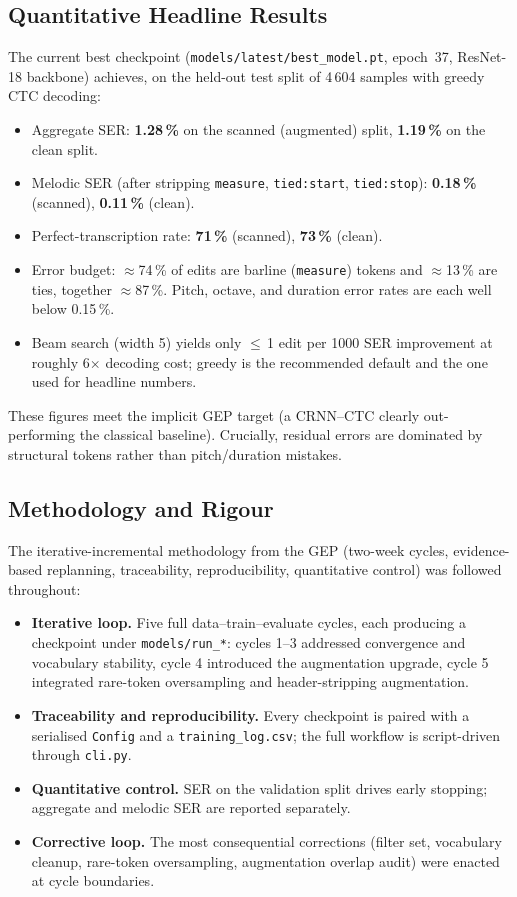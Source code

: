 \documentclass[11pt, a4paper]{article}
\begin{document}
\subsection{Quantitative Headline Results}
The current best checkpoint (\texttt{models/latest/best\_model.pt}, epoch~37, ResNet-18 backbone) achieves, on the held-out test split of 4\,604 samples with greedy CTC decoding:

\begin{itemize}
    \item Aggregate SER: \textbf{1.28\,\%} on the scanned (augmented) split, \textbf{1.19\,\%} on the clean split.
    \item Melodic SER (after stripping \texttt{measure}, \texttt{tied:start}, \texttt{tied:stop}): \textbf{0.18\,\%} (scanned), \textbf{0.11\,\%} (clean).
    \item Perfect-transcription rate: \textbf{71\,\%} (scanned), \textbf{73\,\%} (clean).
    \item Error budget: $\approx$74\,\% of edits are barline (\texttt{measure}) tokens and $\approx$13\,\% are ties, together $\approx$87\,\%. Pitch, octave, and duration error rates are each well below 0.15\,\%.
    \item Beam search (width 5) yields only $\leq$\,1 edit per 1000 SER improvement at roughly 6$\times$ decoding cost; greedy is the recommended default and the one used for headline numbers.
\end{itemize}

These figures meet the implicit GEP target (a CRNN--CTC clearly out-performing the classical baseline). Crucially, residual errors are dominated by structural tokens rather than pitch/duration mistakes.

\subsection{Methodology and Rigour}
The iterative-incremental methodology from the GEP (two-week cycles, evidence-based replanning, traceability, reproducibility, quantitative control) was followed throughout:

\begin{itemize}
    \item \textbf{Iterative loop.} Five full data--train--evaluate cycles, each producing a checkpoint under \texttt{models/run\_*}: cycles 1--3 addressed convergence and vocabulary stability, cycle 4 introduced the augmentation upgrade, cycle 5 integrated rare-token oversampling and header-stripping augmentation.
    \item \textbf{Traceability and reproducibility.} Every checkpoint is paired with a serialised \texttt{Config} and a \texttt{training\_log.csv}; the full workflow is script-driven through \texttt{cli.py}.
    \item \textbf{Quantitative control.} SER on the validation split drives early stopping; aggregate and melodic SER are reported separately.
    \item \textbf{Corrective loop.} The most consequential corrections (filter set, vocabulary cleanup, rare-token oversampling, augmentation overlap audit) were enacted at cycle boundaries.
\end{itemize}
\end{document}
